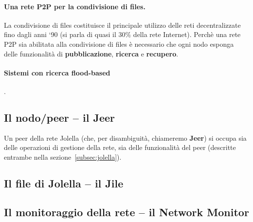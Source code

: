 \paragraph{Una rete P2P per la condivisione di files.} La condivisione di files
costituisce il principale utilizzo delle reti decentralizzate fino dagli anni
`90 (si parla di quasi il $30\%$ della rete Internet). Perchè una rete P2P sia
abilitata alla condivisione di files è necessario che ogni nodo esponga delle
funzionalità di \textbf{pubblicazione}, \textbf{ricerca} e \textbf{recupero}.

\paragraph{Sistemi con ricerca flood-based}.


\subsection{Il nodo/peer -- il Jeer}
\label{subsec:jeer}

Un peer della rete Jolella (che, per disambiguità, chiameremo \textbf{Jeer}) si
occupa sia delle operazioni di gestione della rete, sia delle funzionalità del
peer (descritte entrambe nella sezione~\ref{subsec:jolella}).

\subsection{Il file di Jolella -- il Jile}



\subsection{Il monitoraggio della rete -- il Network Monitor}
